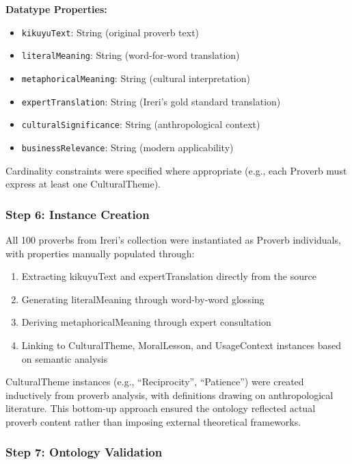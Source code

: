 \textbf{Datatype Properties:}
\begin{itemize}
    \item \texttt{kikuyuText}: String (original proverb text)
    \item \texttt{literalMeaning}: String (word-for-word translation)
    \item \texttt{metaphoricalMeaning}: String (cultural interpretation)
    \item \texttt{expertTranslation}: String (Ireri's gold standard translation)
    \item \texttt{culturalSignificance}: String (anthropological context)
    \item \texttt{businessRelevance}: String (modern applicability)
\end{itemize}

Cardinality constraints were specified where appropriate (e.g., each Proverb must express at least one CulturalTheme).

\subsubsection{Step 6: Instance Creation}
\label{subsubsec:instance_creation}

All 100 proverbs from Ireri's collection were instantiated as Proverb individuals, with properties manually populated through:

\begin{enumerate}
    \item Extracting kikuyuText and expertTranslation directly from the source
    \item Generating literalMeaning through word-by-word glossing
    \item Deriving metaphoricalMeaning through expert consultation
    \item Linking to CulturalTheme, MoralLesson, and UsageContext instances based on semantic analysis
\end{enumerate}

CulturalTheme instances (e.g., ``Reciprocity'', ``Patience'') were created inductively from proverb analysis, with definitions drawing on anthropological literature. This bottom-up approach ensured the ontology reflected actual proverb content rather than imposing external theoretical frameworks.

\subsubsection{Step 7: Ontology Validation}
\label{subsubsec:ontology_validation}

